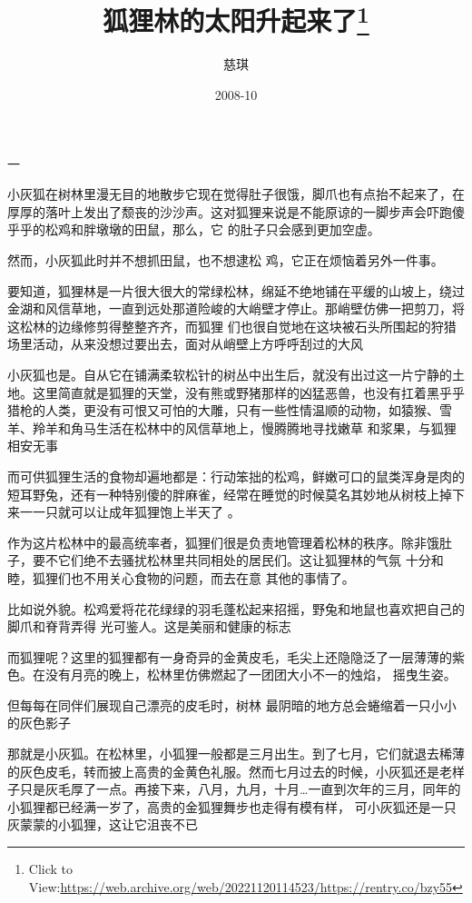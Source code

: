 \documentclass{article}
\title{狐狸林的太阳升起来了\footnote{Click to View:\url{https://web.archive.org/web/20221120114523/https://rentry.co/bzy55}}}
\author{慈琪}
\date{2008-10}
\begin{document}

\maketitle


\Large


﻿一 

小灰狐在树林里漫无目的地散步它现在觉得肚子很饿，脚爪也有点抬不起来了，在厚厚的落叶上发出了颓丧的沙沙声。这对狐狸来说是不能原谅的一脚步声会吓跑傻乎乎的松鸡和胖墩墩的田鼠，那么，它
的肚子只会感到更加空虚。 

然而，小灰狐此时并不想抓田鼠，也不想逮松
鸡，它正在烦恼着另外一件事。 

要知道，狐狸林是一片很大很大的常绿松林，绵延不绝地铺在平缓的山坡上，绕过金湖和风信草地，一直到远处那道险峻的大峭壁才停止。那峭壁仿佛一把剪刀，将这松林的边缘修剪得整整齐齐，而狐狸
\newpage
们也很自觉地在这块被石头所围起的狩猎场里活动，从来没想过要出去，面对从峭壁上方呼呼刮过的大风
 

小灰狐也是。自从它在铺满柔软松针的树丛中出生后，就没有出过这一片宁静的土地。这里简直就是狐狸的天堂，没有熊或野猪那样的凶猛恶兽，也没有扛着黑乎乎猎枪的人类，更没有可恨又可怕的大雕，只有一些性情温顺的动物，如猿猴、雪羊、羚羊和角马生活在松林中的风信草地上，慢腾腾地寻找嫩草
和浆果，与狐狸相安无事 

而可供狐狸生活的食物却遍地都是：行动笨拙的松鸡，鲜嫩可口的鼠类浑身是肉的短耳野兔，还有一种特别傻的胖麻雀，经常在睡觉的时候莫名其妙地从树枝上掉下来一一只就可以让成年狐狸饱上半天了
。 

作为这片松林中的最高统率者，狐狸们很是负责地管理着松林的秩序。除非饿肚子，要不它们绝不去骚扰松林里共同相处的居民们。这让狐狸林的气氛
\newpage
十分和睦，狐狸们也不用关心食物的问题，而去在意
其他的事情了。 

比如说外貌。松鸡爱将花花绿绿的羽毛蓬松起来招摇，野兔和地鼠也喜欢把自己的脚爪和脊背弄得
光可鉴人。这是美丽和健康的标志 

而狐狸呢？这里的狐狸都有一身奇异的金黄皮毛，毛尖上还隐隐泛了一层薄薄的紫色。在没有月亮的晚上，松林里仿佛燃起了一团团大小不一的烛焰，
摇曳生姿。 

但每每在同伴们展现自己漂亮的皮毛时，树林
最阴暗的地方总会蜷缩着一只小小的灰色影子 

那就是小灰狐。在松林里，小狐狸一般都是三月出生。到了七月，它们就退去稀薄的灰色皮毛，转而披上高贵的金黄色礼服。然而七月过去的时候，小灰狐还是老样子只是灰毛厚了一点。再接下来，八月，九月，十月…一直到次年的三月，同年的小狐狸都已经满一岁了，高贵的金狐狸舞步也走得有模有样，
\newpage
可小灰狐还是一只灰蒙蒙的小狐狸，这让它沮丧不已
\end{document}

